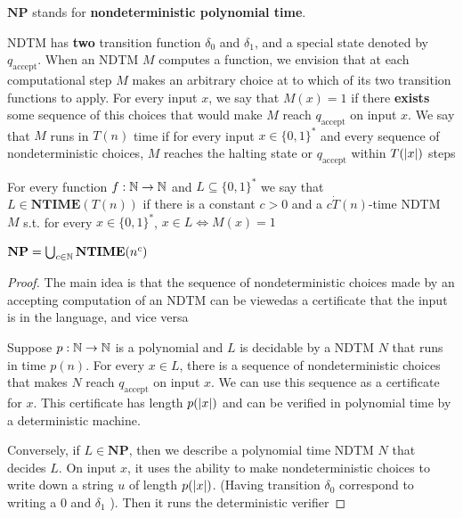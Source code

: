 \documentclass[11pt]{article}
\def \NTIME {\textbf{NTIME}}
\def \NP {\textbf{NP}}
\def \NP {\textbf{NP}}
\def \accept {\text{accept}}
\begin{document}
\(\NP\) stands for \textbf{nondeterministic polynomial time}.

NDTM has \textbf{two} transition function \(\delta_0\) and \(\delta_1\), and a special state denoted
by \(q_{\accept}\). When an NDTM \(M\) computes a function, we envision that at each
computational step \(M\) makes an arbitrary choice at to which of its two transition functions
to apply. For every input \(x\), we say that \(M(x)=1\) if there \textbf{exists} some sequence of this
choices that would make \(M\) reach \(q_{\accept}\) on input \(x\). We say that \(M\) runs
in \(T(n)\) time if for every input \(x\in\{0,1\}^*\) and every sequence of nondeterministic
choices, \(M\) reaches the halting state or \(q_{\accept}\) within \(T(\abs{x})\) steps

\begin{definition}[]
For every function \(f:\mathbb{N}\to\mathbb{N}\) and \(L\subseteq\{0,1\}^*\) we say that \(L\in\NTIME(T(n))\)
if there is a constant \(c>0\) and a \(c\dot T(n)\)-time NDTM \(M\) s.t. for
every \(x\in\{0,1\}^*\), \(x\in L\Leftrightarrow M(x)=1\)
\end{definition}

\begin{theorem}[]
\(\NP=\bigcup_{c\in\N}\NTIME(n^c)\)
\end{theorem}

\begin{proof}
The main idea is that the sequence of nondeterministic choices made by an accepting computation
of an NDTM can be viewedas a certificate that the input is in the language, and vice versa

Suppose \(p:\mathbb{N}\to\mathbb{N}\) is a polynomial and \(L\) is decidable by a NDTM \(N\) that runs in
time \(p(n)\). For every \(x\in L\), there is a sequence of nondeterministic choices that
makes \(N\) reach \(q_{\accept}\) on input \(x\). We can use this sequence as a certificate
for \(x\). This certificate has length \(p(\abs{x})\) and can be verified in polynomial time by
a deterministic machine.

Conversely, if \(L\in\NP\), then we describe a polynomial time NDTM \(N\) that decides \(L\).
On input \(x\), it uses the ability to make nondeterministic choices to write down a
string \(u\) of length \(p(\abs{x})\). (Having transition \(\delta_0\) correspond to writing a
0 and \(\delta_1\) ). Then it runs the deterministic verifier 
\end{proof}
\end{document}
